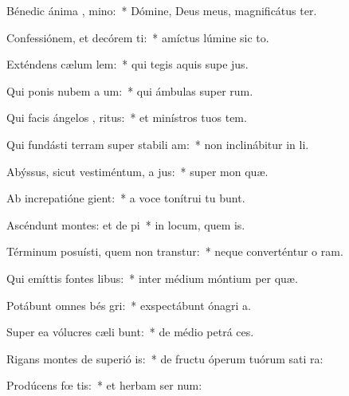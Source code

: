 \item Bénedic ánima , mino:~* Dómine, Deus meus, magnificátus  ter.
\item Confessiónem, et decórem ti:~* amíctus lúmine sic to.
\item Exténdens cælum  lem:~* qui tegis aquis supe jus.
\item Qui ponis nubem a um:~* qui ámbulas super  rum.
\item Qui facis ángelos , ritus:~* et minístros tuos  tem.
\item Qui fundásti terram super stabili am:~* non inclinábitur in  li.
\item Abýssus, sicut vestiméntum, a jus:~* super mon  quæ.
\item Ab increpatióne  gient:~* a voce tonítrui tu bunt.
\item Ascéndunt montes: et de pi~* in locum, quem  is.
\item Términum posuísti, quem non transtur:~* neque converténtur o ram.
\item Qui emíttis fontes  libus:~* inter médium móntium per quæ.
\item Potábunt omnes bés gri:~* exspectábunt ónagri   a.
\item Super ea vólucres cæli bunt:~* de médio petrá  ces.
\item Rigans montes de superió is:~* de fructu óperum tuórum sati ra:
\item Prodúcens fœ tis:~* et herbam ser num:
